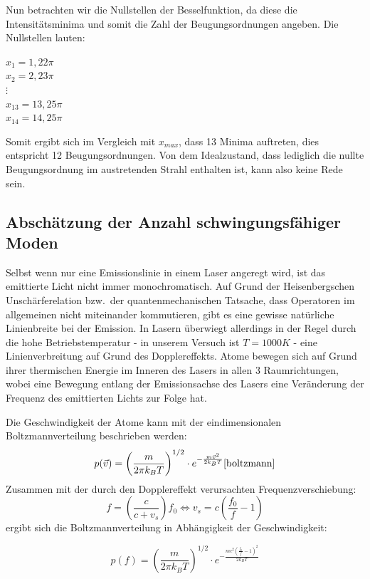 \documentclass[bigchapter,colorback,accentcolor=tud4b,linedtoc,11pt]{tudreport}
\begin{document}
Nun betrachten wir die Nullstellen der Besselfunktion, da diese die Intensitätsminima und somit die Zahl der Beugungsordnungen angeben. Die Nullstellen lauten: 

\begin{center}
$x_1 = 1,22 \pi$     \\
$x_2 = 2,23 \pi$     \\
$\vdots$             \\
$x_{13} = 13,25 \pi$ \\
$x_{14} = 14,25 \pi$
\end{center}

Somit ergibt sich im Vergleich mit $x_{max}$, dass 13 Minima auftreten, dies entspricht 12 Beugungsordnungen. Von dem Idealzustand, dass lediglich die nullte Beugungsordnung im austretenden Strahl enthalten ist, kann also keine Rede sein.

\subsection{Abschätzung der Anzahl schwingungsfähiger Moden}

Selbst wenn nur eine Emissionslinie in einem Laser angeregt wird, ist das
emittierte Licht nicht immer monochromatisch. Auf Grund der Heisenbergschen
Unschärferelation bzw.\ der quantenmechanischen Tatsache, dass Operatoren im
allgemeinen nicht miteinander kommutieren, gibt es eine gewisse natürliche
Linienbreite bei der Emission. In Lasern überwiegt allerdings in der Regel durch
die hohe Betriebstemperatur - in unserem Versuch ist $T = 1000K$ - eine
Linienverbreitung auf Grund des Dopplereffekts. Atome bewegen sich auf Grund
ihrer thermischen Energie im Inneren des Lasers in allen 3 Raumrichtungen, wobei
eine Bewegung entlang der Emissionsachse des Lasers eine Veränderung der
Frequenz des emittierten Lichts zur Folge hat.

Die Geschwindigkeit der Atome kann mit der eindimensionalen Boltzmannverteilung
beschrieben werden:
$$p(\vec{v}) = \left(\frac{m}{2\pi k_B T}\right)^{1/2} \cdot e^{-\frac{m
    \vec{v}^2}{2k_B T}} \cite{boltzmann}$$
Zusammen mit der durch den Dopplereffekt verursachten Frequenzverschiebung:
$$f = \left ( \frac {c}{c + v_{s}} \right ) f_0 \Leftrightarrow v_s=c\left( \frac{f_0}{f}-1 \right)$$
ergibt sich die Boltzmannverteilung in Abhängigkeit der Geschwindigkeit:

$$p(f) = \left(\frac{m}{2\pi k_B T}\right)^{1/2} \cdot e^{-\frac{m
    c^2\left( \frac{f_0}{f}-1 \right)^2}{2k_B T}}$$
\end{document}
